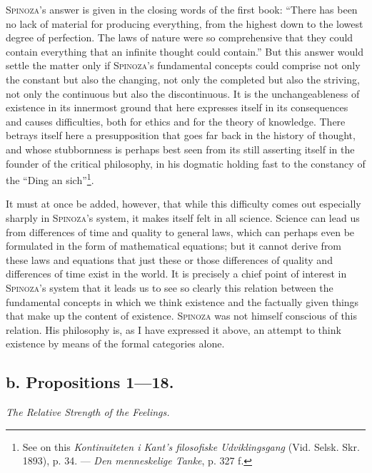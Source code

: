 \documentclass[12pt]{article}
\newcommand{\opage}[1]{\marginnote{\footnotesize\textit{[#1]}}}
\begin{document}
\textsc{Spinoza}'s answer is given in the closing words of the first book: ``There has been no
lack of material for producing everything, from the highest down to the lowest degree of
perfection. The laws of nature were so comprehensive that they could contain everything that an
infinite thought could contain.'' But this answer would settle the matter only if
\opage{73}\textsc{Spinoza}'s fundamental concepts could comprise not only the constant but also the
changing, not only the completed but also the striving, not only the continuous but also the
discontinuous. It is the unchangeableness of existence in its innermost ground that here expresses
itself in its consequences and causes difficulties, both for ethics and for the theory of
knowledge. There betrays itself here a presupposition that goes far back in the history of thought,
and whose stubbornness is perhaps best seen from its still asserting itself in the founder of the
critical philosophy, in his dogmatic holding fast to the constancy of the ``Ding an
sich''\footnote{See on this \textit{Kontinuiteten i Kant's filosofiske Udviklingsgang} (Vid.
Selsk. Skr. 1893), p. 34. --- \textit{Den menneskelige Tanke}, p. 327 f.}.

It must at once be added, however, that while this difficulty comes out especially sharply in
\textsc{Spinoza}'s system, it makes itself felt in all science. Science can lead us from
differences of time and quality to general laws, which can perhaps even be formulated in the form
of mathematical equations; but it cannot derive from these laws and equations that just these or
those differences of quality and differences of time exist in the world. It is precisely a chief
point of interest in \textsc{Spinoza}'s system that it leads us to see so clearly this relation
between the fundamental concepts in which we think existence and the factually given things that
make up the content of existence. \textsc{Spinoza} was not himself conscious of this relation. His
philosophy is, as I have expressed it above, an attempt to think existence by means of the formal
categories alone.

\subsection*{b. Propositions 1---18.}
\begin{center}\textit{The Relative Strength of the Feelings.}\end{center}
\end{document}
